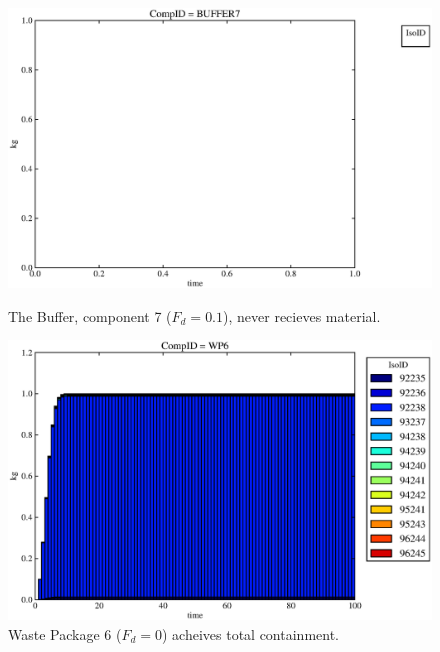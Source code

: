 \begin{figure}[ht]
\begin{minipage}[b]{0.45\linewidth}
  \includegraphics[width=\textwidth]{./chapters/demonstration/base/drII3.eps}
  \caption[Case DRII Buffer Contaminants]{
    The Buffer, component 7 ($F_d = 0.1$), never recieves material.
    }
  \label{fig:drIIbuff}

\end{minipage}
\hspace{0.05\linewidth}
\begin{minipage}[b]{0.45\linewidth}
  \includegraphics[width=\textwidth]{./chapters/demonstration/base/drII2.eps}
  \caption[Case DRII Waste Package Contaminants.]{ 
    Waste Package 6 ($F_d = 0$) acheives total containment.
    }
  \label{fig:drIIwp6}


\end{minipage}
\end{figure}
